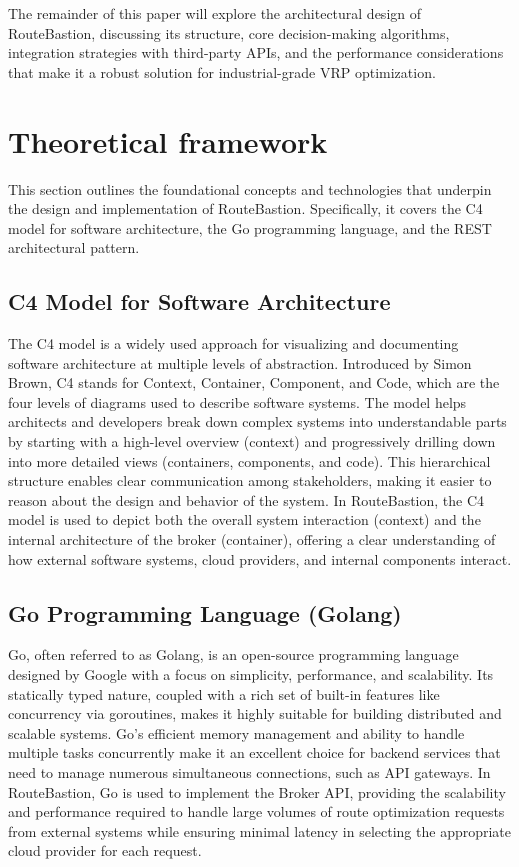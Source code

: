\documentclass[english,notblind]{sbc20}
\begin{document}
The remainder of this paper will explore the architectural design of RouteBastion, discussing its structure, core decision-making algorithms, integration strategies with third-party APIs, and the performance considerations that make it a robust solution for industrial-grade VRP optimization.

\section{Theoretical framework}
\label{sec:theoretical_framework}

This section outlines the foundational concepts and technologies that underpin the design and implementation of RouteBastion. Specifically, it covers the C4 model for software architecture, the Go programming language, and the REST architectural pattern.

\subsection{C4 Model for Software Architecture}
\label{subsec:c4_model_for_software_architecture}
The C4 model is a widely used approach for visualizing and documenting software architecture at multiple levels of abstraction. Introduced by Simon Brown, C4 stands for Context, Container, Component, and Code, which are the four levels of diagrams used to describe software systems. The model helps architects and developers break down complex systems into understandable parts by starting with a high-level overview (context) and progressively drilling down into more detailed views (containers, components, and code). This hierarchical structure enables clear communication among stakeholders, making it easier to reason about the design and behavior of the system. In RouteBastion, the C4 model is used to depict both the overall system interaction (context) and the internal architecture of the broker (container), offering a clear understanding of how external software systems, cloud providers, and internal components interact.

\subsection{Go Programming Language (Golang)}
\label{subsec:go_programming_language}
Go, often referred to as Golang, is an open-source programming language designed by Google with a focus on simplicity, performance, and scalability. Its statically typed nature, coupled with a rich set of built-in features like concurrency via goroutines, makes it highly suitable for building distributed and scalable systems. Go’s efficient memory management and ability to handle multiple tasks concurrently make it an excellent choice for backend services that need to manage numerous simultaneous connections, such as API gateways. In RouteBastion, Go is used to implement the Broker API, providing the scalability and performance required to handle large volumes of route optimization requests from external systems while ensuring minimal latency in selecting the appropriate cloud provider for each request.
\end{document}
